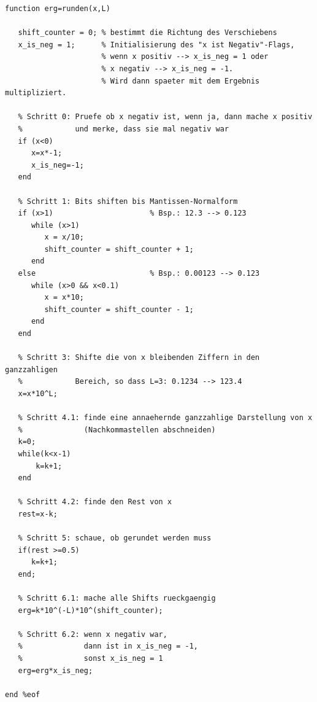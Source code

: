 \documentclass{llncs}
\begin{document}
\begin{verbatim}
function erg=runden(x,L)

   shift_counter = 0; % bestimmt die Richtung des Verschiebens
   x_is_neg = 1; 	  % Initialisierung des "x ist Negativ"-Flags,
                      % wenn x positiv --> x_is_neg = 1 oder
                      % x negativ --> x_is_neg = -1.
                      % Wird dann spaeter mit dem Ergebnis multipliziert.

   % Schritt 0: Pruefe ob x negativ ist, wenn ja, dann mache x positiv
   %            und merke, dass sie mal negativ war
   if (x<0)
      x=x*-1;
      x_is_neg=-1;	
   end

   % Schritt 1: Bits shiften bis Mantissen-Normalform
   if (x>1)                      % Bsp.: 12.3 --> 0.123
      while (x>1)
         x = x/10;
         shift_counter = shift_counter + 1;
      end
   else                          % Bsp.: 0.00123 --> 0.123
      while (x>0 && x<0.1)
         x = x*10;
         shift_counter = shift_counter - 1;
      end		
   end
   
   % Schritt 3: Shifte die von x bleibenden Ziffern in den ganzzahligen
   %            Bereich, so dass L=3: 0.1234 --> 123.4
   x=x*10^L;

   % Schritt 4.1: finde eine annaehernde ganzzahlige Darstellung von x
   %              (Nachkommastellen abschneiden)
   k=0;	
   while(k<x-1)
       k=k+1;
   end
   
   % Schritt 4.2: finde den Rest von x
   rest=x-k;
 	
   % Schritt 5: schaue, ob gerundet werden muss
   if(rest >=0.5)
      k=k+1;
   end;
 	
   % Schritt 6.1: mache alle Shifts rueckgaengig
   erg=k*10^(-L)*10^(shift_counter);
 	
   % Schritt 6.2: wenn x negativ war,
   %              dann ist in x_is_neg = -1,
   %              sonst x_is_neg = 1
   erg=erg*x_is_neg;

end %eof
\end{verbatim}
\newpage
\end{document}
